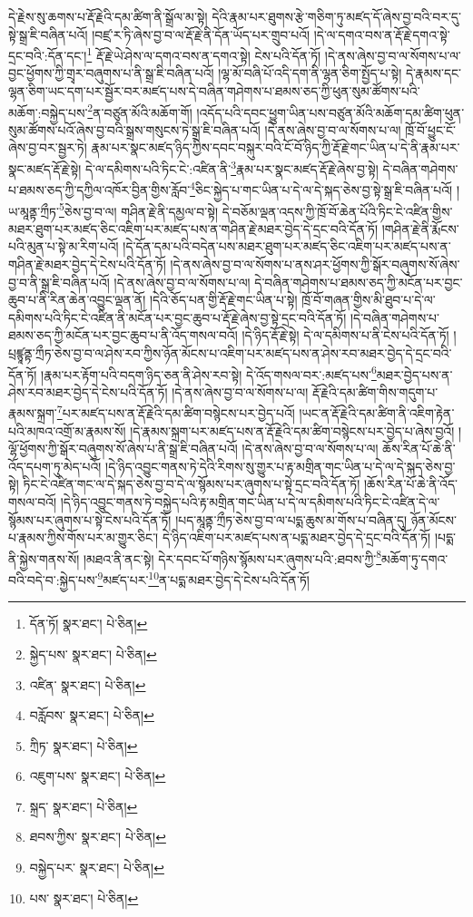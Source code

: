 དེ་རྗེས་སུ་ཆགས་པ་རྡོ་རྗེའི་དམ་ཚིག་ནི་སྒྲོལ་མ་སྟེ། དེའི་རྣམ་པར་ཐུགས་རྩེ་གཅིག་ཏུ་མཛད་དོ་ཞེས་བྱ་བའི་བར་དུ་སྟེ་སྒྲ་ཇི་བཞིན་པའོ། །བཛྲ་ར་ཏི་ཞེས་བྱ་བ་ལ་རྡོ་རྗེ་ནི་དོན་ཡོད་པར་གྲུབ་པའོ། །དེ་ལ་དགའ་བས་ན་རྡོ་རྗེ་དགའ་སྟེ་དྲང་བའི་:དོན་དང་།\footnote{དོན་ཏོ།  སྣར་ཐང་།  པེ་ཅིན། } རྡོ་རྗེ་ཡེ་ཤེས་ལ་དགའ་བས་ན་དགའ་སྟེ། ངེས་པའི་དོན་ཏོ། །དེ་ནས་ཞེས་བྱ་བ་ལ་སོགས་པ་ལ་བྱང་ཕྱོགས་ཀྱི་གྲྭར་བཞུགས་པ་ནི་སྒྲ་ཇི་བཞིན་པའོ། །ལྷ་མོ་བཞི་པོ་འདི་དག་ནི་ལྷན་ཅིག་སྤྱོད་པ་སྟེ། དེ་རྣམས་དང་ལྷན་ཅིག་ཡང་དག་པར་སྦྱོར་བར་མཛད་པས་དེ་བཞིན་གཤེགས་པ་ཐམས་ཅད་ཀྱི་ཕུན་སུམ་ཚོགས་པའི་མཆོག་:བསྐྱེད་པས་\footnote{སྐྱེད་པས་  སྣར་ཐང་།  པེ་ཅིན། }ན་བཙུན་མོའི་མཆོག་གོ། །འདོད་པའི་དབང་ཕྱུག་ཡིན་པས་བཙུན་མོའི་མཆོག་དམ་ཚིག་ཕུན་སུམ་ཚོགས་པའོ་ཞེས་བྱ་བའི་སྒྲས་གསུངས་ཏེ་སྒྲ་ཇི་བཞིན་པའོ། །དེ་ནས་ཞེས་བྱ་བ་ལ་སོགས་པ་ལ། ཁྲོ་བོ་ཕྱུང་ངོ་ཞེས་བྱ་བར་སྦྱར་ཏེ། རྣམ་པར་སྣང་མཛད་ཉིད་ཀྱིས་དབང་བསྐུར་བའི་ངོ་བོ་ཉིད་ཀྱི་རྡོ་རྗེ་གང་ཡིན་པ་དེ་ནི་རྣམ་པར་སྣང་མཛད་རྡོ་རྗེ་སྟེ། དེ་ལ་དམིགས་པའི་ཏིང་ངེ་:འཛིན་ནི་\footnote{འཛིན་  སྣར་ཐང་།  པེ་ཅིན། }རྣམ་པར་སྣང་མཛད་རྡོ་རྗེ་ཞེས་བྱ་སྟེ། དེ་བཞིན་གཤེགས་པ་ཐམས་ཅད་ཀྱི་དཀྱིལ་འཁོར་བྱིན་གྱིས་རློབ་\footnote{བརློབས་  སྣར་ཐང་།  པེ་ཅིན། }ཅིང་སྐྱེད་པ་གང་ཡིན་པ་དེ་ལ་དེ་སྐད་ཅེས་བྱ་སྟེ་སྒྲ་ཇི་བཞིན་པའོ། །ཡ་མཱནྟ་ཀྲྀཏ་\footnote{ཀྲིཏ་  སྣར་ཐང་།  པེ་ཅིན། }ཅེས་བྱ་བ་ལ། གཤིན་རྗེ་ནི་དམྱལ་བ་སྟེ། དེ་བཅོམ་ལྡན་འདས་ཀྱི་ཁྲོ་བོ་ཆེན་པོའི་ཏིང་ངེ་འཛིན་གྱིས་མཐར་ཐུག་པར་མཛད་ཅིང་འཇིག་པར་མཛད་པས་ན་གཤིན་རྗེ་མཐར་བྱེད་དེ་དྲང་བའི་དོན་ཏོ། །གཤིན་རྗེ་ནི་རྨོངས་པའི་མུན་པ་སྟེ་མ་རིག་པའོ། །དེ་དོན་དམ་པའི་བདེན་པས་མཐར་ཐུག་པར་མཛད་ཅིང་འཇིག་པར་མཛད་པས་ན་གཤིན་རྗེ་མཐར་བྱེད་དེ་ངེས་པའི་དོན་ཏོ། །དེ་ནས་ཞེས་བྱ་བ་ལ་སོགས་པ་ནས་ཤར་ཕྱོགས་ཀྱི་སྒོར་བཞུགས་སོ་ཞེས་བྱ་བ་ནི་སྒྲ་ཇི་བཞིན་པའོ། །དེ་ནས་ཞེས་བྱ་བ་ལ་སོགས་པ་ལ། དེ་བཞིན་གཤེགས་པ་ཐམས་ཅད་ཀྱི་མངོན་པར་བྱང་ཆུབ་པ་ནི་རིན་ཆེན་འབྱུང་ལྡན་ནོ། །དེའི་ཅོད་པན་གྱི་རྡོ་རྗེ་གང་ཡིན་པ་སྟེ། ཁྲོ་བོ་གཞན་གྱིས་མི་ཐུབ་པ་དེ་ལ་དམིགས་པའི་ཏིང་ངེ་འཛིན་ནི་མངོན་པར་བྱང་ཆུབ་པ་རྡོ་རྗེ་ཞེས་བྱ་སྟེ་དྲང་བའི་དོན་ཏོ། །དེ་བཞིན་གཤེགས་པ་ཐམས་ཅད་ཀྱི་མངོན་པར་བྱང་ཆུབ་པ་ནི་འོད་གསལ་བའོ། །དེ་ཉིད་རྡོ་རྗེ་སྟེ། དེ་ལ་དམིགས་པ་ནི་ངེས་པའི་དོན་ཏོ། །པྲཛྙཱནྟ་ཀྲྀཏ་ཅེས་བྱ་བ་ལ་ཤེས་རབ་ཀྱིས་ཉོན་མོངས་པ་འཇིག་པར་མཛད་པས་ན་ཤེས་རབ་མཐར་བྱེད་དེ་དྲང་བའི་དོན་ཏོ། །རྣམ་པར་རྟོག་པའི་བདག་ཉིད་ཅན་ནི་ཤེས་རབ་སྟེ། དེ་འོད་གསལ་བར་:མཛད་པས་\footnote{འཇུག་པས་  སྣར་ཐང་།  པེ་ཅིན། }མཐར་བྱེད་པས་ན་ཤེས་རབ་མཐར་བྱེད་དེ་ངེས་པའི་དོན་ཏོ། །དེ་ནས་ཞེས་བྱ་བ་ལ་སོགས་པ་ལ། རྡོ་རྗེའི་དམ་ཚིག་གིས་གདུག་པ་རྣམས་སྐྲག་\footnote{སྐྲད་  སྣར་ཐང་།  པེ་ཅིན། }པར་མཛད་པས་ན་རྡོ་རྗེའི་དམ་ཚིག་བསྙེངས་པར་བྱེད་པའོ། །ཡང་ན་རྡོ་རྗེའི་དམ་ཚིག་ནི་འཇིག་རྟེན་པའི་མཁའ་འགྲོ་མ་རྣམས་སོ། །དེ་རྣམས་སྐྲག་པར་མཛད་པས་ན་རྡོ་རྗེའི་དམ་ཚིག་བསྙེངས་པར་བྱེད་པ་ཞེས་བྱའོ། །ལྷོ་ཕྱོགས་ཀྱི་སྒོར་བཞུགས་སོ་ཞེས་པ་ནི་སྒྲ་ཇི་བཞིན་པའོ། །དེ་ནས་ཞེས་བྱ་བ་ལ་སོགས་པ་ལ། ཆོས་རིན་པོ་ཆེ་ནི་འོད་དཔག་ཏུ་མེད་པའོ། །དེ་ཉིད་འབྱུང་གནས་ཏེ་དེའི་རིགས་སུ་གྱུར་པ་རྟ་མགྲིན་གང་ཡིན་པ་དེ་ལ་དེ་སྐད་ཅེས་བྱ་སྟེ། ཏིང་ངེ་འཛིན་གང་ལ་དེ་སྐད་ཅེས་བྱ་བ་དེ་ལ་སྙོམས་པར་ཞུགས་པ་སྟེ་དྲང་བའི་དོན་ཏོ། །ཆོས་རིན་པོ་ཆེ་ནི་འོད་གསལ་བའོ། །དེ་ཉིད་འབྱུང་གནས་ཏེ་བསྐྱེད་པའི་རྟ་མགྲིན་གང་ཡིན་པ་དེ་ལ་དམིགས་པའི་ཏིང་ངེ་འཛིན་དེ་ལ་སྙོམས་པར་ཞུགས་པ་སྟེ་ངེས་པའི་དོན་ཏོ། །པད་མཱནྟ་ཀྲྀཏ་ཅེས་བྱ་བ་ལ་པདྨ་ཆུས་མ་གོས་པ་བཞིན་དུ། ཉོན་མོངས་པ་རྣམས་ཀྱིས་གོས་པར་མ་གྱུར་ཅིང་། དེ་ཉིད་འཇིག་པར་མཛད་པས་ན་པདྨ་མཐར་བྱེད་དེ་དྲང་བའི་དོན་ཏོ། །པདྨ་ནི་སྐྱེས་གནས་སོ། །མཐའ་ནི་ནང་སྟེ། དེར་དབང་པོ་གཉིས་སྙོམས་པར་ཞུགས་པའི་:ཐབས་ཀྱི་\footnote{ཐབས་ཀྱིས་  སྣར་ཐང་།  པེ་ཅིན། }མཆོག་ཏུ་དགའ་བའི་བདེ་བ་:སྐྱེད་པས་\footnote{བསྐྱེད་པར་  སྣར་ཐང་།  པེ་ཅིན། }མཛད་པར་\footnote{པས་  སྣར་ཐང་།  པེ་ཅིན། }ན་པདྨ་མཐར་བྱེད་དེ་ངེས་པའི་དོན་ཏོ། 